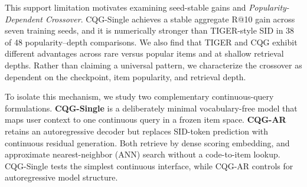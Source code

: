 \documentclass[letterpaper]{article}
\begin{document}
This support limitation motivates examining seed-stable gains and \emph{Popularity-Dependent
Crossover}. CQG-Single achieves a stable
aggregate R@10 gain across seven training seeds, and it is
numerically stronger than TIGER-style SID in 38 of 48 popularity--depth
comparisons. 
We also find that TIGER and CQG exhibit different advantages across rare versus popular items and at shallow retrieval depths. Rather than claiming a universal pattern, we characterize the crossover as dependent on the checkpoint, item popularity, and retrieval depth. 

To isolate this mechanism, we study two complementary continuous-query
formulations. \textbf{CQG-Single} is a deliberately minimal vocabulary-free
model that maps user context to one continuous query in a frozen item space.
\textbf{CQG-AR} retains an autoregressive decoder but replaces
SID-token prediction with continuous residual generation.
Both retrieve by dense scoring embedding, and approximate nearest-neighbor (ANN) search without a code-to-item lookup.
CQG-Single tests the simplest continuous interface, while CQG-AR controls for
autoregressive model structure.
\end{document}
